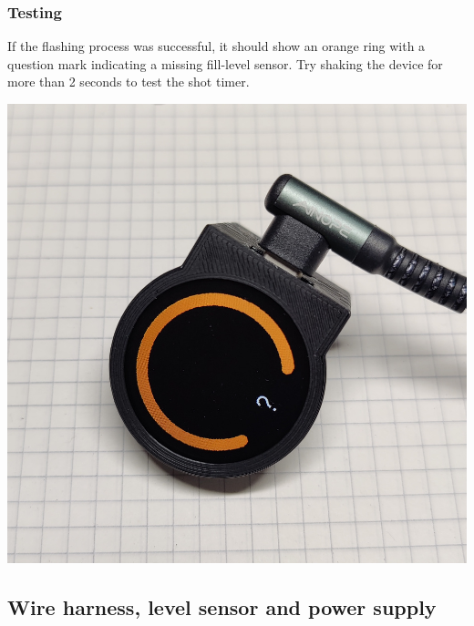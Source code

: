 \documentclass[]{article}
\begin{document}
\subsubsection{Testing}
\begin{minipage}[t]{0.5\linewidth}
	\vspace{0pt}
	If the flashing process was successful, it should show an orange ring with a question mark indicating a missing fill-level sensor. Try shaking the device for more than 2 seconds to test the shot timer.
\end{minipage}
\hfill
\begin{minipage}[t]{0.4\linewidth}
	\vspace{0pt}
	\includegraphics[width=\linewidth]{images/01_displayunit/21_check_display.jpg}
\end{minipage}


\subsection{Wire harness, level sensor and power supply}
\end{document}
